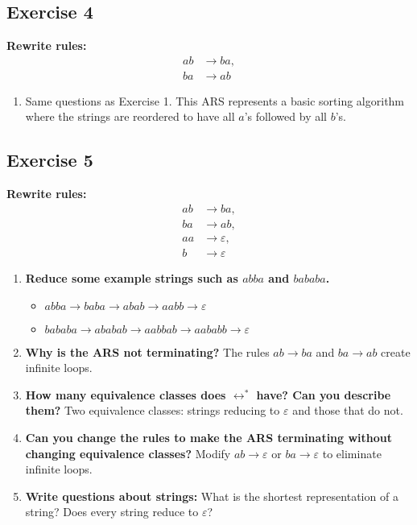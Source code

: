 \documentclass{article}
\theoremstyle{theorem}
\theoremstyle{definition}
\theoremstyle{remark}
\begin{document}
\subsection*{Exercise 4}
\textbf{Rewrite rules:} 
\[
\begin{aligned}
    ab &\to ba, \\
    ba &\to ab
\end{aligned}
\]
\begin{enumerate}
    \item Same questions as Exercise 1. This ARS represents a basic sorting algorithm where the strings are reordered to have all \( a \)'s followed by all \( b \)'s.
\end{enumerate}

\subsection*{Exercise 5}
\textbf{Rewrite rules:} 
\[
\begin{aligned}
    ab &\to ba, \\
    ba &\to ab, \\
    aa &\to \varepsilon, \\
    b &\to \varepsilon
\end{aligned}
\]
\begin{enumerate}
    \item \textbf{Reduce some example strings such as \( abba \) and \( bababa \).}
        \begin{itemize}
            \item \( abba \to baba \to abab \to aabb \to \varepsilon \)
            \item \( bababa \to ababab \to aabbab \to aababb \to \varepsilon \)
        \end{itemize}
    \item \textbf{Why is the ARS not terminating?} The rules \( ab \to ba \) and \( ba \to ab \) create infinite loops.
    \item \textbf{How many equivalence classes does \( \leftrightarrow^\ast \) have? Can you describe them?} Two equivalence classes: strings reducing to \( \varepsilon \) and those that do not.
    \item \textbf{Can you change the rules to make the ARS terminating without changing equivalence classes?} Modify \( ab \to \varepsilon \) or \( ba \to \varepsilon \) to eliminate infinite loops.
    \item \textbf{Write questions about strings:} What is the shortest representation of a string? Does every string reduce to \( \varepsilon \)?
\end{enumerate}
\end{document}
